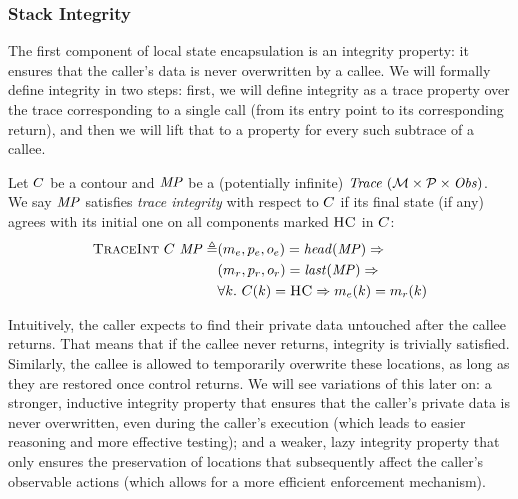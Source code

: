 \documentclass[acmsmall,review,anonymous]{acmart}\settopmatter{printfolios=true,printccs=false,printacmref=false}
\begin{document}


\subsubsection{Stack Integrity}

The first component of local state encapsulation is an integrity
property: it ensures that the caller's data is never overwritten by a
callee. We will formally define integrity in two steps: first, we will
define integrity as a trace property over the trace corresponding to a
single call (from its entry point to its corresponding return), and
then we will lift that to a property for every such subtrace of a
callee.


Let \(C\) be a contour and \(\mathit{MP}\) be a (potentially infinite)
\(\mathit{Trace}~({\mathcal M} \times \mathcal{P} \times \mathit{Obs})\). We say \(\mathit{MP}\) satisfies {\em trace integrity} with
respect to \(C\) if its final state (if any) agrees with its
initial one on all components marked \(\textsc{HC}\) in \(C\):
%
\[\begin{split}
  \text{\sc TraceInt} ~ C ~ \mathit{MP} \triangleq &
    (m_e,p_e,o_e) = \mathit{head}(\mathit{MP}) \Rightarrow \\
  & (m_r,p_r,o_r) = \mathit{last}(\mathit{MP}) \Rightarrow \\
  & \forall k. ~ C(k) = \textsc{HC} \Rightarrow
    m_e(k) = m_r(k) \\
\end{split}\]

Intuitively, the caller expects to find their private data untouched
after the callee returns. That means that if the callee never returns,
integrity is trivially satisfied. Similarly, the callee is allowed to
temporarily overwrite these locations, as long as they are restored
once control returns. We will see variations of this later on: a
stronger, inductive integrity property that ensures that the caller's
private data is never overwritten, even during the caller's execution
(which leads to easier reasoning and more effective testing);
and a weaker, lazy integrity property that only ensures the preservation
of locations that subsequently affect the caller's observable actions
(which allows for a more efficient enforcement mechanism).
\end{document}
